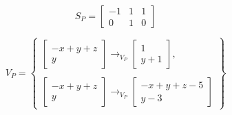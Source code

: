 \begin{center}
	\begin{minipage}{0.3\linewidth}
		\begin{equation*}
		S_P = 
			\begin{bmatrix}
				-1 & 1 & 1 \\
				0 & 1 & 0
			\end{bmatrix}
		\end{equation*}
	\end{minipage}
	\begin{minipage}{0.6\linewidth}
		\begin{equation*}
		    V_P = \begin{Bmatrix}
		              \begin{bmatrix}
		                    - x + y + z \\
		                    y
		               \end{bmatrix} \rightarrow_{V_P}
		               \begin{bmatrix}
		                     1 \\
		                     y + 1
		               \end{bmatrix}, \\ \\
		               \begin{bmatrix}
		                     - x + y + z \\
		                    y
		               \end{bmatrix} \rightarrow_{V_P}
		               \begin{bmatrix}
		                    - x + y + z - 5 \\
		                    y - 3
		              \end{bmatrix}
		    \end{Bmatrix}
		\end{equation*}
	\end{minipage}
\end{center}
